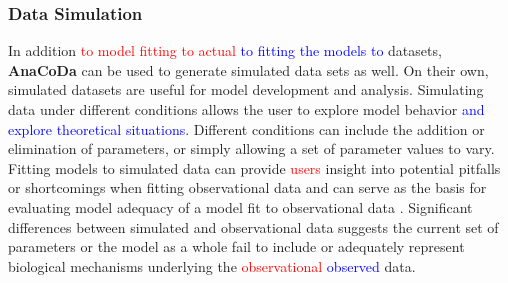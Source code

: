 \documentclass{bioinfo}
\newcommand{\package}{\textbf{AnaCoDa}\xspace} %
\begin{document}
\subsubsection*{Data Simulation}
In addition \textcolor{red}{to model fitting to actual} \textcolor{blue}{to fitting the models to} datasets, \package can be used to generate simulated data sets as well.
On their own, simulated datasets are useful for model development and analysis.
Simulating data under different conditions allows the user to explore model behavior \textcolor{blue}{and explore theoretical situations}. 
Different conditions can include the addition or elimination of parameters, or simply allowing a set of parameter values to vary.
Fitting models to simulated data can provide \textcolor{red}{users} insight into potential pitfalls or shortcomings when fitting observational data and can serve as the basis for evaluating model adequacy of a model fit to observational data \citep{gumi2015}.
Significant differences between simulated and observational data suggests the current set of parameters or the model as a whole fail to include or adequately represent biological mechanisms underlying the \textcolor{red}{observational} \textcolor{blue}{observed} data.
 
\end{document}
